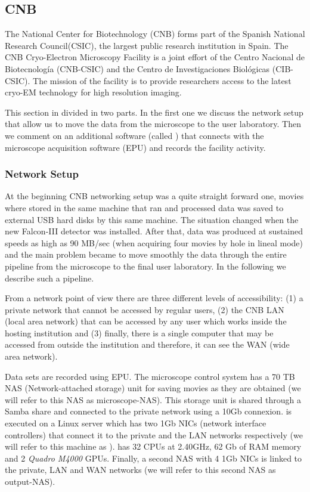 \subsection{CNB}
The National Center for Biotechnology (CNB) forms part of the Spanish National Research Council(CSIC), the largest public research institution in Spain. 
The CNB Cryo-Electron Microscopy Facility is a joint effort of the Centro Nacional de Biotecnología (CNB-CSIC) and the Centro de Investigaciones Biológicas (CIB-CSIC). The mission of the facility is to provide researchers access to the latest cryo-EM technology for high resolution imaging. 

This section in divided in two parts. In the first one we discuss the network setup that allow us to move the data from the microscope to the user laboratory. Then  we comment on an additional software (called  \emadmin) that connects \scipion with the microscope acquisition software (EPU) and records the facility activity.

\subsubsection{Network Setup}

At the beginning CNB networking setup was a quite straight forward one, movies where stored in the  same machine that ran \scipion and processed data was saved to external USB hard disks by this same machine. The situation changed when the new Falcon-III detector was installed. After that, data was produced at sustained speeds as high as 90 MB/sec (when acquiring four movies by hole in lineal mode) and the main problem became to move smoothly the data through the entire pipeline from the microscope to the final user laboratory. In the following we describe such a pipeline.

From a network point of view there are three different levels of accessibility: (1) a private network that cannot be accessed by regular users, (2) the CNB LAN (local area network)  that can be accessed by any user which works inside the hosting  institution and (3) finally, there is a single computer that may be accessed from outside the institution and therefore, it can see the WAN (wide area network).

Data sets are recorded using EPU. The microscope control system has a 70 TB NAS (Network-attached storage) unit for saving movies as they are obtained (we will refer to this NAS as microscope-NAS). This storage unit is shared through a Samba share and connected to the private network using a 10Gb connexion. \scipion is executed on a Linux server which has two 1Gb NICs (network interface controllers) that connect it to the private and the LAN networks respectively (we will refer to this machine as \scipionbox). \scipionbox has 32 CPUs at 2.40GHz, 62 Gb of RAM memory and 2 \textit{Quadro M4000} GPUs. Finally, a second NAS with 4 1Gb NICs is linked to the private, LAN and WAN networks (we will refer to this second NAS as output-NAS).

